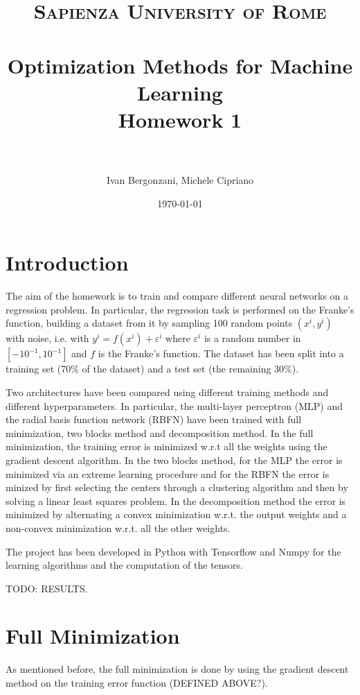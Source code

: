 \documentclass[paper=a4, fontsize=11pt]{scrartcl} %
\title{
\normalfont \normalsize
\textsc{Sapienza University of Rome} \\ [25pt] %
\horrule{0.5pt} \\[0.4cm] %
\huge Optimization Methods for Machine Learning \\ %
\large Homework 1 \\
\horrule{2pt} \\[0.5cm] %
}
\author{Ivan Bergonzani, Michele Cipriano} %
\date{\normalsize\today} %
\numberwithin{equation}{section} %
\numberwithin{figure}{section} %
\numberwithin{table}{section} %
\theoremstyle{definition}
\begin{document}
\maketitle %


\section{Introduction}

The aim of the homework is to train and compare different neural networks on a
regression problem. In particular, the regression task is performed on the Franke's
function, building a dataset from it by sampling 100 random points $(x^i, y^i)$ with noise,
i.e. with $y^i = f(x^i) + \varepsilon^i$ where $\varepsilon^i$ is a random number in
$[-10^{-1}, 10^{-1}]$ and $f$ is the Franke's function.
The dataset has been split into a training set (70\% of the dataset)
and a test set (the remaining 30\%).

Two architectures have been compared using different training methods and different
hyperparameters. In particular, the multi-layer perceptron (MLP) and the radial basis
function network (RBFN) have been trained with full minimization, two blocks method
and decomposition method. In the full minimization, the training
error is minimized w.r.t all the weights using the gradient descent algorithm.
In the two blocks method, for the MLP
the error is minimized via an extreme learning procedure and for the RBFN the
error is minized by first selecting the centers through a clustering algorithm
and then by solving a linear least squares problem. In the decomposition method
the error is minimized by alternating a convex minimization w.r.t. the output
weights and a non-convex minimization w.r.t. all the other weights.

The project has been developed in Python with Tensorflow and Numpy for the
learning algorithms and the computation of the tensors.

TODO: RESULTS.


\section{Full Minimization}

As mentioned before, the full minimization is done by using the gradient
descent method on the training error function (DEFINED ABOVE?).
\end{document}
